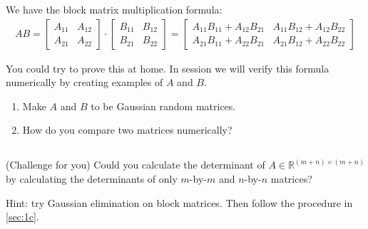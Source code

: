 \documentclass[11pt,letterpaper]{article}
\begin{document}
We have the block matrix multiplication formula:
\begin{align*}
    AB = \left[
\begin{array}{c|c} A_{11} & A_{12} \\\hline A_{21} & A_{22} \end{array} \right]\cdot
\left[
\begin{array}{c|c} B_{11} & B_{12} \\\hline B_{21} & B_{22} \end{array} \right]
= 
\left[
\begin{array}{c|c} A_{11}B_{11}+A_{12}B_{21} & A_{11}B_{12}+A_{12}B_{22} \\\hline A_{21}B_{11}+A_{22}B_{21} & A_{21}B_{12}+A_{22}B_{22} \end{array} \right]
\end{align*}

You could try to prove this at home. In session we will verify this formula numerically by creating examples of $A$ and $B$.

\begin{enumerate}
    \item Make $A$ and $B$ to be Gaussian random matrices.
    \item How do you compare two matrices numerically?
\end{enumerate}

\subsection{}
(Challenge for you) Could you calculate the determinant of $A\in \mathbb{R}^{(m+n)\times(m+n)}$ by calculating the determinants of only $m$-by-$m$ and $n$-by-$n$ matrices? 

Hint: try Gaussian elimination on block matrices. Then follow the procedure in \ref{sec:1c}.


\newpage


\end{document}
